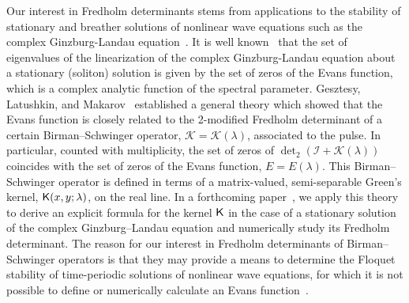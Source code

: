 \documentclass{birkjour}
\theoremstyle{definition}
\theoremstyle{remark}
\numberwithin{equation}{section}
\begin{document}
Our interest in  Fredholm determinants  stems from applications to the
stability of stationary and breather
solutions of nonlinear wave equations such as the 
complex Ginzburg-Landau equation~\cite{Kap,EssSpec}. %
It is well known~\cite{Kap} that the set of eigenvalues of
the linearization of the complex Ginzburg-Landau equation
about  a stationary (soliton) solution
is given by the set of zeros of the Evans function, which is a complex analytic function
of the spectral parameter.  
Gesztesy, Latushkin, and Makarov~\cite{EJF} 
established a general theory which showed that 
the  Evans function is closely related to the 2-modified
Fredholm determinant of a certain Birman–Schwinger operator, 
$\mathcal K=\mathcal K(\lambda)$, associated to the pulse. 
In particular, counted with multiplicity, 
the set of zeros of $\operatorname{det}_2(\mathcal I+\mathcal K(\lambda))$
coincides with the set of 
zeros of the Evans function, $E=E(\lambda)$. 
This Birman–Schwinger operator is defined in terms of a matrix-valued,
semi-separable Green’s kernel, $\textsf  K(x,y;\lambda)$, on the real line. 
In a forthcoming paper~\cite{Gallo}, we apply this theory to derive an explicit formula for the kernel
 $\textsf  K$ in the case of a stationary  solution of 
the complex Ginzburg–Landau equation and numerically study its 
Fredholm determinant.
The reason for our interest in 
Fredholm determinants of Birman–Schwinger operators is that they may
provide a means to determine the Floquet stability of time-periodic solutions of 
nonlinear wave equations, for which it is not possible to define or numerically calculate 
an Evans function~\cite{GeLaZu08}.
\end{document}

